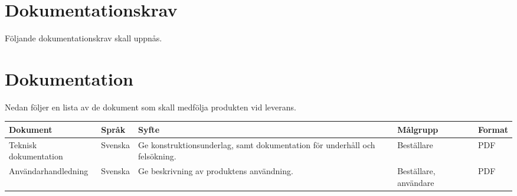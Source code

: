 \documentclass[kravspec/krav.tex]{subfiles}
\begin{document}
\section{Dokumentationskrav}
\label{sec:doc}
Följande dokumentationskrav skall uppnås.
\begin{reqlist}
\end{reqlist}

\section{Dokumentation}
\label{sec:doc}
Nedan följer en lista av de dokument som skall medfölja produkten vid leverans.
{\renewcommand{\arraystretch}{1.6}
\begin{longtable}{p{4.5cm}p{1.5cm}p{5cm}p{2cm}p{1.2cm}}
    \bfseries Dokument &
    \bfseries Språk &
    \bfseries Syfte &
    \bfseries Målgrupp &
    \bfseries Format \\\hline
    Teknisk dokumentation &
    Svenska &
    Ge konstruktionsunderlag, samt dokumentation för underhåll och
    felsökning. &
    Beställare &
    PDF
    \\
    Användarhandledning &
    Svenska &
    Ge beskrivning av produktens användning. &
    Beställare, användare &
    PDF
    \endhead
\end{longtable}
}
\end{document}
